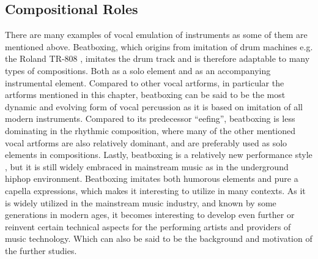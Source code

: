 \subsection{ Compositional Roles }
There are many examples of vocal emulation of instruments as some of them are mentioned above. Beatboxing, which origins from imitation of drum machines e.g. the Roland TR-808 \citep{proctor2012}, imitates the drum track and is therefore adaptable to many types of compositions. Both as a solo element and as an accompanying instrumental element. Compared to other vocal artforms, in particular the artforms mentioned in this chapter, beatboxing can be said to be the most dynamic and evolving form of vocal percussion as it is based on imitation of all modern instruments. Compared to its predecessor “eefing”, beatboxing is less dominating in the rhythmic composition, where many of the other mentioned vocal artforms are also relatively dominant, and are preferably used as solo elements in compositions. Lastly, beatboxing is a relatively new performance style \citep{Stowell2008}, but it is still widely embraced in mainstream music as in the underground hiphop environment. Beatboxing imitates both humorous elements and pure a capella expressions, which makes it interesting to utilize in many contexts. 
As it is widely utilized in the mainstream music industry, and known by some generations in modern ages, it becomes interesting to develop even further or reinvent certain technical aspects for the performing artists and providers of music technology. Which can also be said to be the background and motivation of the further studies.